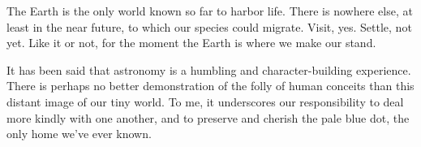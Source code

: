 \documentclass[12pt, openany, letterpaper]{memoir}
\begin{document}
The Earth is the only world known so far to harbor life. There is nowhere else, at least in the near future, to which our species could migrate. Visit, yes. Settle, not yet. Like it or not, for the moment the Earth is where we make our stand.

It has been said that astronomy is a humbling and character-building experience. There is perhaps no better demonstration of the folly of human conceits than this distant image of our tiny world. To me, it underscores our responsibility to deal more kindly with one another, and to preserve and cherish the pale blue dot, the only home we've ever known.

\end{document}
